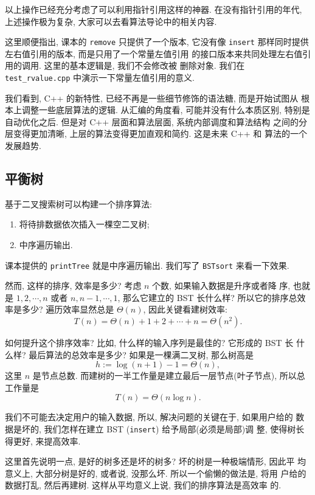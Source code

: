 \documentclass[a4paper]{ctexart}
\theoremstyle{definition}
\theoremstyle{definition}
\begin{document}
以上操作已经充分考虑了可以利用指针引用这样的神器. 在没有指针引用的年代,
上述操作极为复杂, 大家可以去看算法导论中的相关内容.

这里顺便指出, 课本的 \verb|remove| 只提供了一个版本, 它没有像
\verb|insert| 那样同时提供左右值引用的版本, 而是只用了一个常量左值引用
的接口版本来共同处理左右值引用的调用. 这里的基本逻辑是, 我们不会修改被
删除对象. 我们在 \verb|test_rvalue.cpp| 中演示一下常量左值引用的意义.

我们看到, C++ 的新特性, 已经不再是一些细节修饰的语法糖, 而是开始试图从
根本上调整一些底层算法的逻辑. 从汇编的角度看, 可能并没有什么本质区别,
特别是自动优化之后. 但是对 C++ 层面和算法层面, 系统内部调度和算法结构
之间的分层变得更加清晰, 上层的算法变得更加直观和简约. 这是未来 C++ 和
算法的一个发展趋势. 

\subsection{平衡树}

基于二叉搜索树可以构建一个排序算法:

\begin{enumerate}
\item 将待排数据依次插入一棵空二叉树;
\item 中序遍历输出.
\end{enumerate}

课本提供的 \verb|printTree| 就是中序遍历输出. 我们写了 \verb|BSTsort|
来看一下效果.

然而, 这样的排序, 效率是多少? 考虑 $n$ 个数, 如果输入数据是升序或者降
序, 也就是 $1, 2, \cdots, n$ 或者 $n, n - 1, \cdots, 1$, 那么它建立的
BST 长什么样? 所以它的排序总效率是多少? 遍历效率显然总是 $\Theta(n)$,
因此关键看建树效率:
$$
T(n) = \Theta(n) + 1 + 2 + \cdots + n = \Theta(n^2).
$$

如何提升这个排序效率? 比如, 什么样的输入序列是最佳的? 它形成的 BST 长
什么样? 最后算法的总效率是多少? 如果是一棵满二叉树, 那么树高是
$$
h :=\log (n + 1) - 1 = \Theta(n),
$$
这里 $n$ 是节点总数. 而建树的一半工作量是建立最后一层节点(叶子节点), 所以总工作量是
$$
T(n) = \Theta(n\log n).
$$

我们不可能去决定用户的输入数据, 所以, 解决问题的关键在于, 如果用户给的
数据是坏的, 我们怎样在建立 BST (\verb|insert|) 给予局部(必须是局部)调
整, 使得树长得更好, 来提高效率.

这里首先说明一点, 是好的树多还是坏的树多? 坏的树是一种极端情形, 因此平
均意义上, 大部分树是好的, 或者说, 没那么坏. 所以一个偷懒的做法是, 将用
户给的数据打乱, 然后再建树. 这样从平均意义上说, 我们的排序算法是高效率
的.
\end{document}
